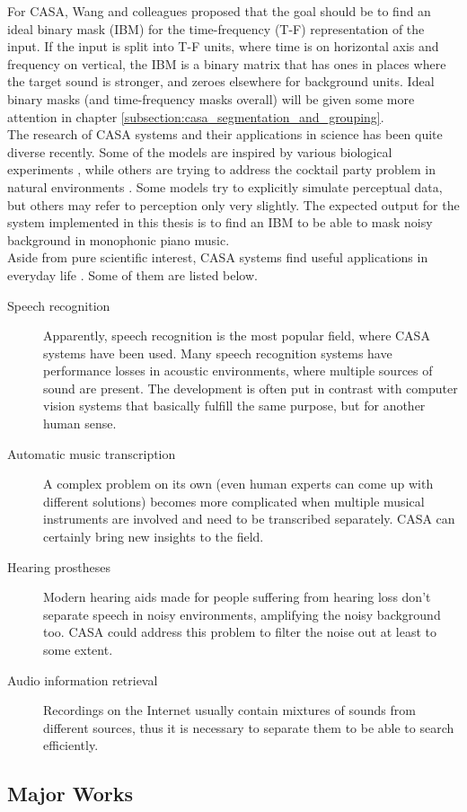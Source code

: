 For CASA, Wang and colleagues \cite{Wang2005} proposed that the goal should be to find an ideal binary mask (IBM) for the time-frequency (T-F) representation of the input. If the input is split into T-F units, where time is on horizontal axis and frequency on vertical, the IBM is a binary matrix that has ones in places where the target sound is stronger, and zeroes elsewhere for background units. Ideal binary masks (and time-frequency masks overall) will be given some more attention in chapter \ref{subsection:casa_segmentation_and_grouping}.\\

The research of CASA systems and their applications in science \cite{Szabo2016} has been quite diverse recently. Some of the models are inspired by various biological experiments \cite{Wang2008}\cite{Boes2011}, while others are trying to address the cocktail party problem in natural environments \cite{Elhilali2008}. Some models try to explicitly simulate perceptual data, but others may refer to perception only very slightly. The expected output for the system implemented in this thesis is to find an IBM to be able to mask noisy background in monophonic piano music.\\

Aside from pure scientific interest, CASA systems find useful applications in everyday life \cite{Wang2006}. Some of them are listed below.

\begin{description}
	\item[Speech recognition] Apparently, speech recognition is the most popular field, where CASA systems have been used. Many speech recognition systems have performance losses in acoustic environments, where multiple sources of sound are present. The development is often put in contrast with computer vision systems that basically fulfill the same purpose, but for another human sense.
	\item[Automatic music transcription] A complex problem on its own (even human experts can come up with different solutions) becomes more complicated when multiple musical instruments are involved and need to be transcribed separately. CASA can certainly bring new insights to the field.
	\item[Hearing prostheses] Modern hearing aids made for people suffering from hearing loss don't separate speech in noisy environments, amplifying the noisy background too. CASA could address this problem to filter the noise out at least to some extent.
	\item[Audio information retrieval] Recordings on the Internet usually contain mixtures of sounds from different sources, thus it is necessary to separate them to be able to search efficiently.
\end{description}

\subsection{Major Works}

